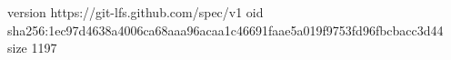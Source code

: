 version https://git-lfs.github.com/spec/v1
oid sha256:1ec97d4638a4006ca68aaa96acaa1c46691faae5a019f9753fd96fbcbacc3d44
size 1197
